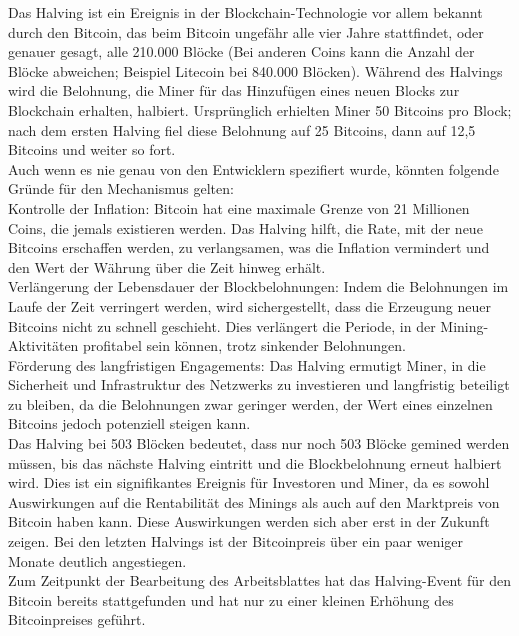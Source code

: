 \documentclass[german]{../uebung}
\begin{document}
\begin{exercise}{1.2}
	Das Halving ist ein Ereignis in der Blockchain-Technologie vor allem bekannt durch den Bitcoin, das beim Bitcoin ungefähr alle vier Jahre stattfindet, oder genauer gesagt, alle 210.000 Blöcke (Bei anderen Coins kann die Anzahl der Blöcke abweichen; Beispiel Litecoin bei 840.000 Blöcken). Während des Halvings wird die Belohnung, die Miner für das Hinzufügen eines neuen Blocks zur Blockchain erhalten, halbiert. Ursprünglich erhielten Miner 50 Bitcoins pro Block; nach dem ersten Halving fiel diese Belohnung auf 25 Bitcoins, dann auf 12,5 Bitcoins und weiter so fort.\\
	Auch wenn es nie genau von den Entwicklern spezifiert wurde, könnten folgende Gründe für den Mechanismus gelten:\\
	Kontrolle der Inflation: Bitcoin hat eine maximale Grenze von 21 Millionen Coins, die jemals existieren werden. Das Halving hilft, die Rate, mit der neue Bitcoins erschaffen werden, zu verlangsamen, was die Inflation vermindert und den Wert der Währung über die Zeit hinweg erhält.\\
	Verlängerung der Lebensdauer der Blockbelohnungen: Indem die Belohnungen im Laufe der Zeit verringert werden, wird sichergestellt, dass die Erzeugung neuer Bitcoins nicht zu schnell geschieht. Dies verlängert die Periode, in der Mining-Aktivitäten profitabel sein können, trotz sinkender Belohnungen.\\
	Förderung des langfristigen Engagements: Das Halving ermutigt Miner, in die Sicherheit und Infrastruktur des Netzwerks zu investieren und langfristig beteiligt zu bleiben, da die Belohnungen zwar geringer werden, der Wert eines einzelnen Bitcoins jedoch potenziell steigen kann.\\
	Das Halving bei 503 Blöcken bedeutet, dass nur noch 503 Blöcke gemined werden müssen, bis das nächste Halving eintritt und die Blockbelohnung erneut halbiert wird. Dies ist ein signifikantes Ereignis für Investoren und Miner, da es sowohl Auswirkungen auf die Rentabilität des Minings als auch auf den Marktpreis von Bitcoin haben kann. Diese Auswirkungen werden sich aber erst in der Zukunft zeigen. Bei den letzten Halvings ist der Bitcoinpreis über ein paar weniger Monate deutlich angestiegen.\\
	Zum Zeitpunkt der Bearbeitung des Arbeitsblattes hat das Halving-Event für den Bitcoin bereits stattgefunden und hat nur zu einer kleinen Erhöhung des Bitcoinpreises geführt.
\end{exercise}
\end{document}
